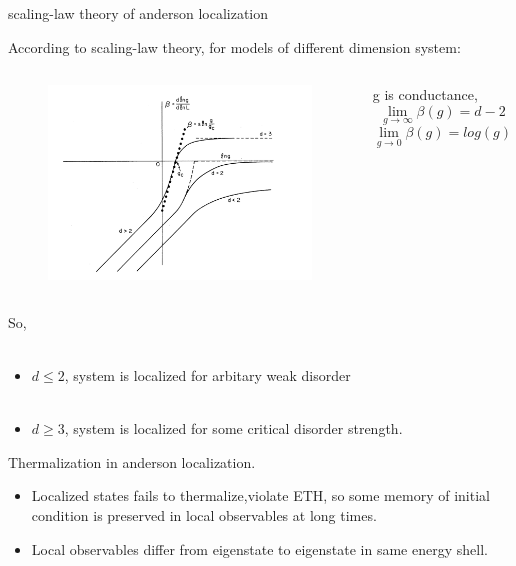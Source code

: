\documentclass{beamer}
\begin{document}
\begin{frame}{scaling-law theory of anderson localization}

According to scaling-law theory, for models of different dimension system:
\begin{columns}
\begin{figure}
\includegraphics[width=1\linewidth]{scaling}
\end{figure}
g is conductance,
$$\lim_{g\to\infty}\beta(g)=d-2$$
$$\lim_{g\to0}\beta(g)=log(g)$$

\end{columns}
\end{frame}

\begin{frame}
So, \\~
\begin{itemize}

\item $d\leqslant 2$, system is localized for arbitary weak disorder\\~

\item $d\geqslant 3$, system is localized for some critical disorder strength.
\end{itemize}

\end{frame}


\begin{frame}
Thermalization in anderson localization.

\begin{itemize}

\item Localized states fails to thermalize,violate ETH, so some memory of initial condition is preserved in local observables at long times.

\pause \item Local observables differ from eigenstate to eigenstate in same energy shell.

\end{itemize}

\end{frame}
\end{document}
